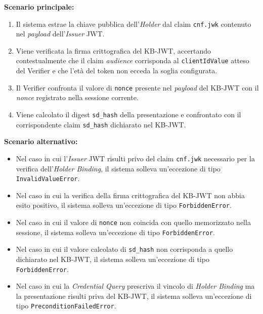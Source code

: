 \noindent\textbf{Scenario principale:}
\begin{enumerate}
    \item Il sistema estrae la chiave pubblica dell'\textit{Holder} dal claim \texttt{cnf.jwk} contenuto nel \textit{payload} dell'\textit{Issuer} JWT.
    \item Viene verificata la firma crittografica del KB-JWT, accertando contestualmente che il claim \textit{audience} corrisponda al \texttt{clientIdValue} atteso del Verifier e che l'età del token non ecceda la soglia configurata.
    \item Il Verifier confronta il valore di \texttt{nonce} presente nel \textit{payload} del KB-JWT con il \textit{nonce} registrato nella sessione corrente.
    \item Viene calcolato il digest \texttt{sd\_\allowbreak{}hash} della presentazione e confrontato con il corrispondente claim \texttt{sd\_\allowbreak{}hash} dichiarato nel KB-JWT.
\end{enumerate}

\noindent\textbf{Scenario alternativo:}
\begin{itemize}
    \item Nel caso in cui l'\textit{Issuer} JWT risulti privo del claim \texttt{cnf.jwk} necessario per la verifica dell'\textit{Holder Binding}, il sistema solleva un'eccezione di tipo \texttt{InvalidValueError}.
    \item Nel caso in cui la verifica della firma crittografica del KB-JWT non abbia esito positivo, il sistema solleva un'eccezione di tipo \texttt{ForbiddenError}.
    \item Nel caso in cui il valore di \texttt{nonce} non coincida con quello memorizzato nella sessione, il sistema solleva un'eccezione di tipo \texttt{ForbiddenError}.
    \item Nel caso in cui il valore calcolato di \texttt{sd\_\allowbreak{}hash} non corrisponda a quello dichiarato nel KB-JWT, il sistema solleva un'eccezione di tipo \texttt{ForbiddenError}.
    \item Nel caso in cui la \textit{Credential Query} prescriva il vincolo di \textit{Holder Binding} ma la presentazione risulti priva del KB-JWT, il sistema solleva un'eccezione di tipo \texttt{PreconditionFailedError}.
\end{itemize}

